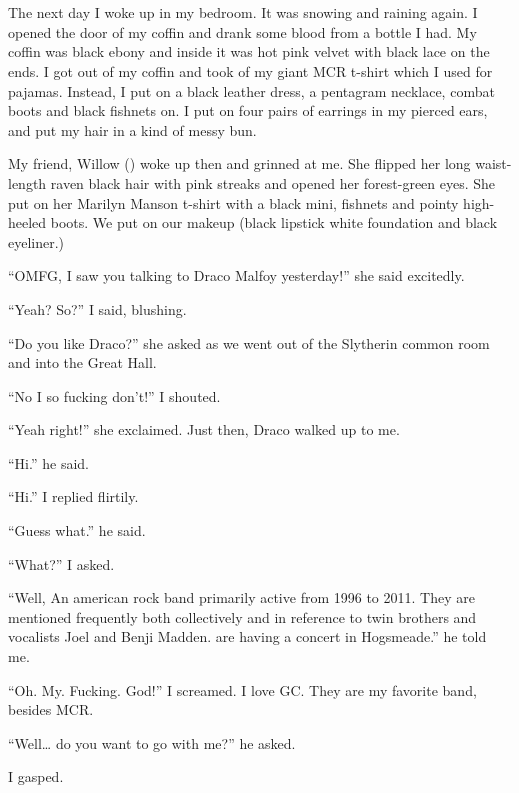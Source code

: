 \section{}



The next day I woke up in my bedroom. It was snowing and raining again. I opened the door of my coffin and drank some blood from a bottle I had. My coffin was black ebony and inside it was hot pink velvet with black lace on the ends. I got out of my coffin and took of my giant MCR t-shirt which I used for pajamas. Instead, I put on a black leather dress, a pentagram necklace, combat boots and black fishnets on. I put on four pairs of earrings in my pierced ears, and put my hair in a kind of messy bun.

My friend, Willow () woke up then and grinned at me. She flipped her long waist-length raven black hair with pink streaks and opened her forest-green eyes. She put on her Marilyn Manson t-shirt with a black mini, fishnets and pointy high-heeled boots. We put on our makeup (black lipstick white foundation and black eyeliner.)

\enquote{OMFG, I saw you talking to Draco Malfoy yesterday!} she said excitedly.

\enquote{Yeah? So?} I said, blushing.

\enquote{Do you like Draco?} she asked as we went out of the Slytherin common room and into the Great Hall.

\enquote{No I so fucking don't!} I shouted.

\enquote{Yeah right!} she exclaimed. Just then, Draco walked up to me.

\enquote{Hi.} he said.

\enquote{Hi.} I replied flirtily.

\enquote{Guess what.} he said.

\enquote{What?} I asked.

\enquote{Well,
{An american rock band primarily active from 1996 to 2011.
They are mentioned frequently both collectively and
in reference to twin brothers and vocalists Joel and
Benji Madden.}
are having a concert in Hogsmeade.} he told me.

\enquote{Oh. My. Fucking. God!} I screamed. I love GC\@. They are my favorite band, besides MCR\@.

\enquote{Well\ldots{} do you want to go with me?} he asked.

I gasped.
